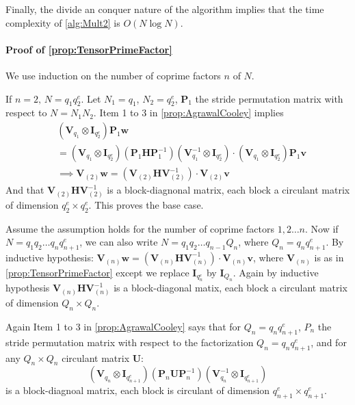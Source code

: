\begin{ext_proof}
    Finally, the divide an conquer nature of the algorithm implies that the time complexity of \cref{alg:Mult2} is \(O(N \log N)\).
\end{ext_proof}

\paragraph{\bf Proof of \cref{prop:TensorPrimeFactor}}
\begin{ext_proof} \label{proof:TensorPrimeFactor}
    We use induction on the number of coprime factors \(n\) of \(N\).

    If \(n = 2,\, N = q_1 q_2^e\). Let \(N_1 = q_1\), \(N_2 = q_2^e\), \(\bm{P}_1\) the stride permutation matrix with respect to \(N = N_1 N_2\). Item 1 to 3 in \cref{prop:AgrawalCooley} implies
    \begin{align*}
        &\left(\bm{V}_{q_1} \otimes \bm{I}_{q_2^e}\right) \bm{P}_1 \bm{w} \\
        &= \left(\bm{V}_{q_1} \otimes \bm{I}_{q_2^e}\right) \left(\bm{P}_1 \bm{H} \bm{P}_1^{-1}\right) \left(\bm{V}_{q_1}^{-1} \otimes \bm{I}_{q_2^e}\right) \cdot \left(\bm{V}_{q_1} \otimes \bm{I}_{q_2^e}\right) \bm{P}_1 \bm{v} \\
        &\implies \bm{V}_{(2)} \bm{w} = \left(\bm{V}_{(2)} \bm{H} \bm{V}_{(2)}^{-1}\right) \cdot \bm{V}_{(2)} \bm{v}
    \end{align*}
    And that \(\bm{V}_{(2)} \bm{H} \bm{V}_{(2)}^{-1}\) is a block-diagnonal matrix, each block a circulant matrix of dimension \(q_2^e \times q_2^e\). This proves the base case.

    Assume the assumption holds for the number of coprime factors \(1, 2 \ldots n\). Now if \(N = q_1 q_2 \ldots q_n q_{n+1}^e\), we can also write \(N = q_1 q_2 \ldots q_{n-1} Q_n\), where \(Q_n = q_n q_{n+1}^e\). By inductive hypothesis: \(\bm{V}_{(n)} \bm{w} = \left(\bm{V}_{(n)} \bm{H} \bm{V}_{(n)}^{-1}\right) \cdot \bm{V}_{(n)} \bm{v}\), where \(\bm{V}_{(n)}\) is as in \cref{prop:TensorPrimeFactor} except we replace \(\bm{I}_{q_n^e}\) by \(\bm{I}_{Q_n}\). Again by inductive hypothesis \(\bm{V}_{(n)} \bm{H} \bm{V}_{(n)}^{-1}\) is a block-diagonal matix, each block a circulant matrix of dimension \(Q_n \times Q_n\).

    Again Item 1 to 3 in \cref{prop:AgrawalCooley} says that for \(Q_n = q_n q_{n+1}^e\), \(P_n\) the stride permutation matrix with respect to the factorization \(Q_n = q_n q_{n+1}^e\), and for any \(Q_n \times Q_n\) circulant matrix \(\bm{U}\):
    \[\left(\bm{V}_{q_n} \otimes \bm{I}_{q_{n+1}^e}\right) \left(\bm{P}_n \bm{U} \bm{P}_n^{-1}\right) \left(\bm{V}_{q_n}^{-1} \otimes \bm{I}_{q_{n+1}^e}\right)\]
    is a block-diagnoal matrix, each block is circulant of dimension \(q_{n+1}^e \times q_{n+1}^e\).


\end{ext_proof}
